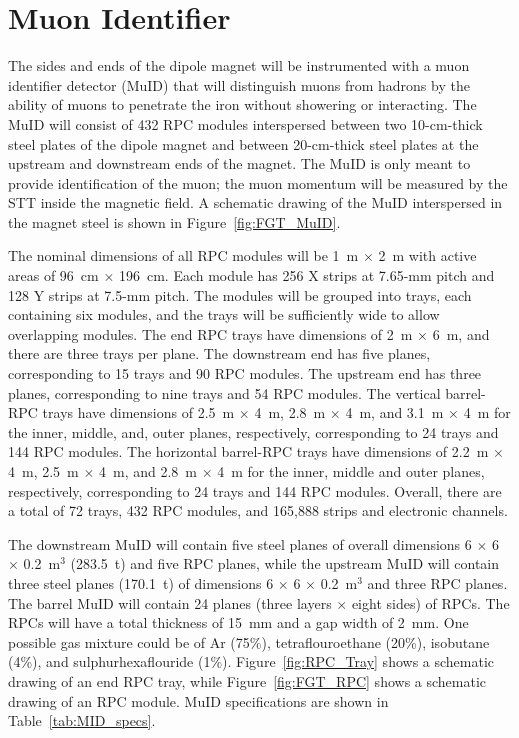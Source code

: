 \section{Muon Identifier}
\label{sec:nd-nnd-muid}

The sides and ends of the dipole magnet will be instrumented
with a muon identifier
detector (MuID) that will distinguish muons from hadrons by the ability 
of muons to penetrate the iron without showering or interacting.
The MuID will consist of 432 RPC modules
interspersed between two 10-cm-thick steel plates of the 
dipole magnet and between 20-cm-thick steel plates at the upstream and
downstream ends of the magnet. 
The MuID is only meant to provide %
identification of the 
muon; the muon momentum %
will be measured by the STT inside the 
magnetic field. A schematic drawing of the MuID 
interspersed in the magnet steel is shown in Figure~\ref{fig:FGT_MuID}.

The nominal dimensions of all RPC modules will be 1~m $\times$ 2~m with
active areas of 96~cm $\times$ 196~cm. Each
module has 256 X strips
at 7.65-mm pitch and 128 Y strips at 7.5-mm pitch. The modules
will be grouped into trays, each containing six modules, and the trays will
be sufficiently wide to allow overlapping modules. 
The end RPC trays have dimensions of 2~m $\times$ 6~m, and there are three trays per plane.
The downstream end has five planes, corresponding to 15 trays and 90 RPC modules.
The upstream end has three planes, corresponding to nine trays and 54 RPC modules.
The vertical barrel-RPC trays have dimensions of 2.5~m $\times$ 4~m, 2.8~m $\times$ 4~m, and
3.1~m $\times$ 4~m for the inner, middle, and, outer planes, respectively, corresponding
to 24 trays and 144 RPC modules. The horizontal
barrel-RPC trays have dimensions of 2.2~m $\times$ 4~m, 2.5~m $\times$ 4~m, and
2.8~m $\times$ 4~m for the inner, middle and outer planes, respectively, 
corresponding to 24 trays and 144 RPC modules. Overall, there are a total of
72 trays, 432 RPC modules, and 165,888 strips and electronic channels. 

The downstream MuID will contain five steel planes of 
overall dimensions
6 $\times$ 6 $\times$ 0.2~m$^3$ (283.5~t)
and five RPC planes, while the upstream MuID will contain three steel
planes (170.1~t) of dimensions 6 $\times$ 6 $\times$ 0.2~m$^3$ and three RPC planes. The barrel MuID will contain
24 planes (three layers $\times$ eight sides) of RPCs. The RPCs will have a total thickness 
of 15~mm and a gap width of 2~mm. One possible gas mixture could be %
of Ar (75\%), tetraflouroethane (20\%), isobutane (4\%),
and sulphurhexaflouride (1\%). 
Figure~\ref{fig:RPC_Tray} shows a schematic drawing of an end RPC tray,
while Figure~\ref{fig:FGT_RPC} shows a schematic drawing of an RPC module.
MuID specifications are shown in Table~\ref{tab:MID_specs}.

